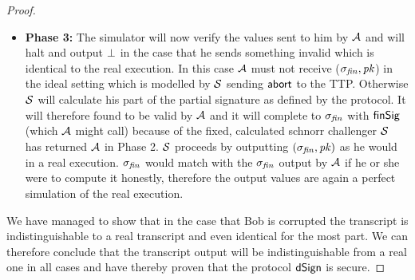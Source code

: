 \begin{proof}
\begin{itemize}
        \item \textbf{Phase 3: } The simulator will now verify the values sent to him by $\mathcal{A}$ and will halt and output $\bot$ in the case that he sends something invalid which is identical to the real execution.
        In this case $\mathcal{A}$ must not receive ($\sigma_{\mathit{fin}}, \mathit{pk}$) in the ideal setting which is modelled by $\mathcal{S}$ sending $\mathsf{abort}$ to the TTP.
        Otherwise $\mathcal{S}$ will calculate his part of the partial signature as defined by the protocol.
        It will therefore found to be valid by $\mathcal{A}$ and it will complete to $\sigma_{\mathit{fin}}$ with $\mathsf{finSig}$ (which $\mathcal{A}$ might call) because of the fixed, calculated schnorr challenger $\mathcal{S}$ has returned $\mathcal{A}$ in Phase 2.
        $\mathcal{S}$ proceeds by outputting $(\sigma_{\mathit{fin}}, \mathit{pk})$ as he would in a real execution.
        $\sigma_{\mathit{fin}}$ would match with the $\sigma_{\mathit{fin}}$ output by $\mathcal{A}$ if he or she were to compute it honestly, therefore the output values are again a perfect simulation of the real execution.
    \end{itemize}

    We have managed to show that in the case that Bob is corrupted the transcript is indistinguishable to a real transcript and even identical for the most part.
    We can therefore conclude that the transcript output will be indistinguishable from a real one in all cases and have thereby proven that the protocol $\mathsf{dSign}$ is secure.
\end{proof}

